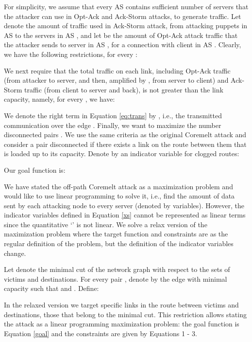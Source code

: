 \documentclass[conference]{IEEEtran}
\begin{document}
For simplicity, we assume that every AS contains sufficient number of servers that the attacker can use in Opt-Ack and Ack-Storm attacks, to generate traffic. Let  denote the amount of traffic used in Ack-Storm attack, from attacking puppets in AS  to the servers in AS , and let  be the amount of Opt-Ack attack traffic that the attacker sends to server in AS , for a connection with client in AS . Clearly, we have the following restrictions, for every : 


We next require that the total traffic on each link, including Opt-Ack traffic (from attacker to server, and then, amplified by , from server to client) and Ack-Storm traffic (from client to server and back), is not greater than the link capacity, namely, for every , we have: 



We denote the right term in Equation \ref{eq:trans} by , i.e., the transmitted communication over the edge .
Finally, we want to maximize the number disconnected pairs . We use the same criteria as the original Coremelt attack and consider a pair  disconnected if there exists a link on the route between them that is loaded up to its capacity. Denote by  an indicator variable for clogged routes:



Our goal function is:


We have stated the off-path Coremelt attack as a maximization problem and would like to use linear programming to solve it, i.e., find the amount of data sent by each attacking node to every server (denoted by  variables). However, the indicator variables defined in Equation \ref{xs} cannot be represented as linear terms since the quantitative `' is not linear. We solve a relax version of the maximization problem where the target function and constraints are as the regular definition of the problem, but the definition of the indicator variables change. 

Let  denote the minimal cut of the network graph  with respect to the sets of victims and destinations. For every pair , denote by  the edge with minimal capacity such that  and . Define:



In the relaxed version we target specific links in the route between victims and destinations, those that belong to the minimal cut. This restriction allows stating the attack as a linear programming maximization problem: the goal function is Equation \ref{goal} and the constraints are given by Equations 1 - 3.
\end{document}
